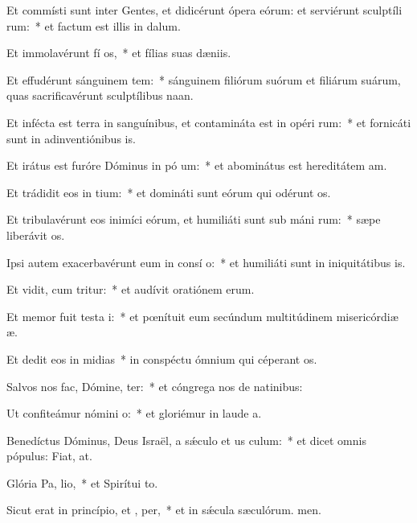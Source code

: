 \item Et commísti sunt inter Gentes, et didicérunt ópera eórum: et serviérunt sculptíli rum:~* et factum est illis in dalum.
\item Et immolavérunt fí os,~* et fílias suas dæniis.
\item Et effudérunt sánguinem tem:~* sánguinem filiórum suórum et filiárum suárum, quas sacrificavérunt sculptílibus naan.
\item Et infécta est terra in sanguínibus, et contamináta est in opéri rum:~* et fornicáti sunt in adinventiónibus is.
\item Et irátus est furóre Dóminus in pó um:~* et abominátus est hereditátem am.
\item Et trádidit eos in  tium:~* et domináti sunt eórum qui odérunt os.
\item Et tribulavérunt eos inimíci eórum, et humiliáti sunt sub máni rum:~* sæpe liberávit os.
\item Ipsi autem exacerbavérunt eum in consí o:~* et humiliáti sunt in iniquitátibus is.
\item Et vidit, cum tritur:~* et audívit oratiónem erum.
\item Et memor fuit testa i:~* et pœnítuit eum secúndum multitúdinem misericórdiæ æ.
\item Et dedit eos in midias~* in conspéctu ómnium qui céperant os.
\item Salvos nos fac, Dómine,  ter:~* et cóngrega nos de natinibus:
\item Ut confiteámur nómini  o:~* et gloriémur in laude a.
\item Benedíctus Dóminus, Deus Israël, a sǽculo et us  culum:~* et dicet omnis pópulus: Fiat, at.
\item Glória Pa,  lio,~* et Spirítui to.
\item Sicut erat in princípio, et ,  per,~* et in sǽcula sæculórum. men.
